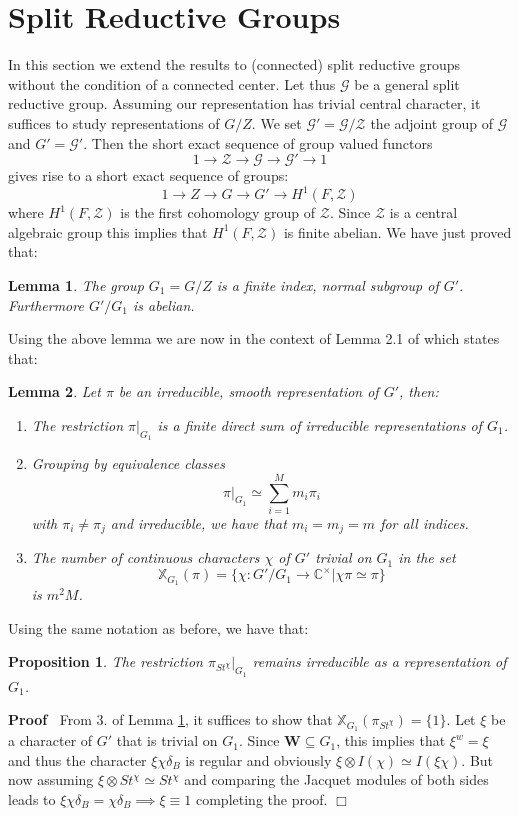 \documentclass{article}
\newenvironment{proof}{\noindent\textbf{Proof\ }}{\hspace*{\fill}$\Box$\medskip}
\newtheorem{lemma}{Lemma}
\newtheorem{proposition}{Proposition}
\begin{document}
\section{Split Reductive Groups}
In this section we extend the results to (connected) split reductive groups without the condition of a connected center. Let thus $\mathcal{G}$ be a general split reductive group. Assuming our representation has trivial central character, it suffices to study representations of $G/Z$. We set $\mathcal{G}'=\mathcal{G}/\mathcal{Z}$ the adjoint group of $\mathcal{G}$ and $G'=\mathcal{G}'$. Then the short exact sequence of group valued functors $$1\to \mathcal{Z}\to\mathcal{G}\to\mathcal{G}'\to 1$$ 
gives rise to a short exact sequence of groups:
$$1\to Z\to G\to G'\to H^1(F,\mathcal{Z})$$ where $H^1(F,\mathcal{Z})$ is the first cohomology group of $\mathcal{Z}$. Since $\mathcal{Z}$ is a central algebraic group this implies that $H^1(F,\mathcal{Z})$ is finite abelian. We have just proved that: 
\begin{lemma} \label{lem:irred}
    The group $G_1=G/Z$ is a finite index, normal subgroup of $G'$. Furthermore $G'/G_1$ is abelian.
\end{lemma}
Using the above lemma we are now in the context of Lemma 2.1 of \cite{gel-knap} which states that:
\begin{lemma}
   Let $\pi$ be an irreducible, smooth representation of $G'$, then:
   \begin{enumerate}
       \item The restriction $\pi|_{G_1}$ is a finite direct sum of irreducible representations of $G_1$.
       \item Grouping by equivalence classes $$\pi|_{G_1}\simeq\sum\limits_{i=1}^Mm_i\pi_i$$ with $\pi_i\ne\pi_j$ and irreducible, we have that $m_i=m_j=m$ for all indices. 
       \item The number of continuous characters $\chi$ of $G'$ trivial on $G_1$ in the set $$\mathbb{X}_{G_1}(\pi)=\{\chi:G'/G_1\to\mathbb{C}^{\times}|\chi\pi\simeq\pi\}$$ is $m^2M$.
   \end{enumerate}
\end{lemma}
Using the same notation as before, we have that:
\begin{proposition}
The restriction $\pi_{St^{\chi}}|_{G_1}$ remains irreducible as a representation of $G_1$.
\end{proposition}
\begin{proof}
    From 3. of Lemma \ref{lem:irred}, it suffices to show that $\mathbb{X}_{G_1}(\pi_{St^{\chi}})=\{1\}$. Let $\xi$ be a character of $G'$ that is trivial on $G_1$. Since $\mathbf{W}\subseteq G_1$, this implies that $\xi^w=\xi$ and thus the character $\xi\chi\delta_B$ is regular and obviously $\xi\otimes I(\chi)\simeq I(\xi\chi)$. But now assuming $\xi\otimes St^{\chi}\simeq St^{\chi}$ and comparing the Jacquet modules of both sides leads to $\xi\chi\delta_B=\chi\delta_B \implies \xi\equiv 1$ completing the proof.
\end{proof}
\end{document}
